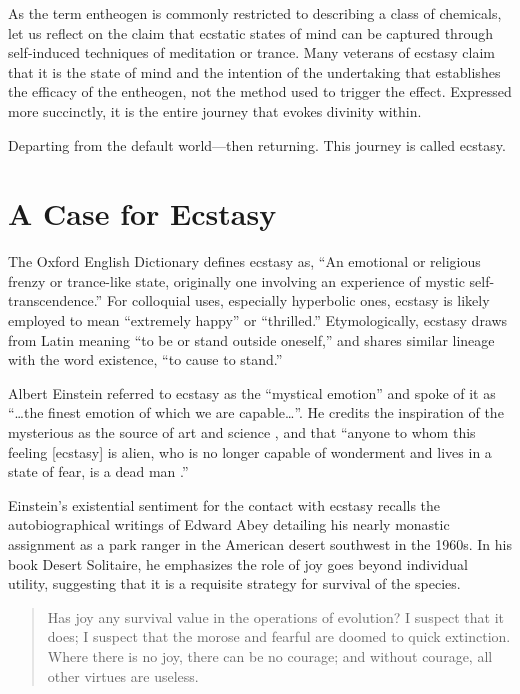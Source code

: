 \documentclass{UIdahoMastersThesis}
\begin{document}
As the term entheogen is commonly restricted to describing a class of chemicals, let us reflect on the claim that ecstatic states of mind can be captured through self-induced techniques of meditation or trance. Many veterans of ecstasy claim that it is the state of mind and the intention of the undertaking that establishes the efficacy of the entheogen, not the method used to trigger the effect. Expressed more succinctly, it is the entire journey that evokes divinity within. 

Departing from the default world---then returning. This journey is called ecstasy.


\section{A Case for Ecstasy}
The Oxford English Dictionary defines ecstasy as, ``An emotional or religious frenzy or trance-like state, originally one involving an experience of mystic self-transcendence.'' For colloquial uses, especially hyperbolic ones, ecstasy is likely employed to mean ``extremely happy'' or ``thrilled.'' Etymologically, ecstasy draws from Latin meaning ``to be or stand outside oneself,'' and shares similar lineage with the word existence, ``to cause to stand.''
 
Albert Einstein referred to ecstasy as the ``mystical emotion'' and spoke of it as \enquote{\ldots the finest emotion of which we are capable\ldots}. He credits the inspiration of the mysterious as the source of art and science , and that \enquote{anyone to whom this feeling [ecstasy] is alien, who is no longer capable of wonderment and lives in a state of fear, is a dead man \cite{einstein_science_1930}.}

Einstein's existential sentiment for the contact with ecstasy recalls the autobiographical writings of Edward Abey detailing his nearly monastic assignment as a park ranger in the American desert southwest in the 1960s. In his book Desert Solitaire, he emphasizes the role of joy goes beyond individual utility, suggesting that it is a requisite strategy for survival of the species. 


\begin{quote}
{Has joy any survival value in the operations of evolution? I suspect that it does; I suspect that the morose and fearful are doomed to quick extinction. Where there is no joy, there can be no courage; and without courage, all other virtues are useless.}
\end{quote}
\end{document}
